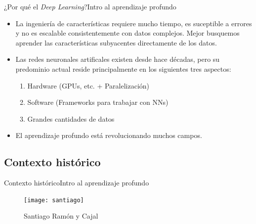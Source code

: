 \documentclass[10pt,border=3pt,tikz]{beamer}
\begin{document}
    \begin{frame}{¿Por qué el \textsl{Deep Learning}?}{Intro al aprendizaje profundo}
        \begin{center}
            \begin{itemize}
                \item La ingeniería de características requiere mucho tiempo, es suceptible a errores y no es escalable consistentemente con datos complejos. Mejor busquemos aprender las características subyacentes directamente de los datos.
                \item Las redes neuronales artificales existen desde hace décadas, pero su predominio actual reside principalmente en los siguientes tres aspectos:
                \begin{enumerate}
                    \item Hardware (GPUs, etc. + Paralelización)
                    \item Software (Frameworks para trabajar con NNs)
                    \item Grandes cantidades de datos
                \end{enumerate}
                \item El aprendizaje profundo está revolucionando muchos campos.
            \end{itemize}
        \end{center}
    \end{frame}
    
    \subsection{Contexto histórico}
    
    \begin{frame}{Contexto histórico}{Intro al aprendizaje profundo}
        \begin{figure}
            \centering
            \texttt{[image: santiago]}
            \caption{Santiago Ramón y Cajal}
        \end{figure}
    \end{frame}
    
\end{document}
